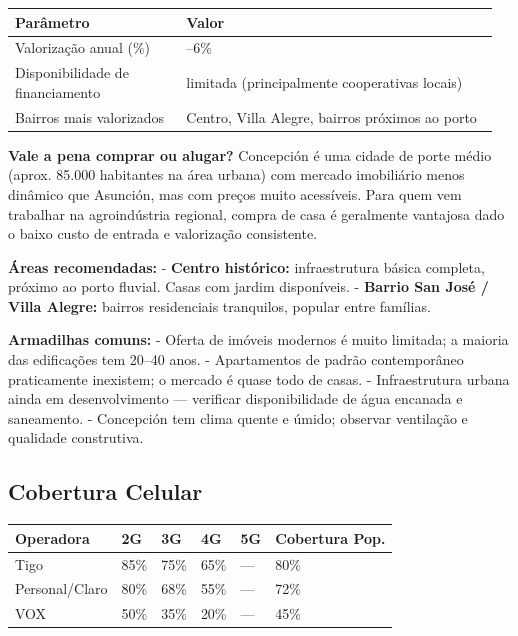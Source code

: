 {\small
\setlength{\tabcolsep}{3pt}
\renewcommand{\arraystretch}{1.12}
\begin{tabularx}{\linewidth}{>{\raggedright\arraybackslash}p{0.34\linewidth} >{\raggedright\arraybackslash}p{0.62\linewidth}}
\toprule
Parâmetro & Valor \\
\midrule
Valorização anual (\%) & 4--6\% \\
Disponibilidade de financiamento & limitada (principalmente cooperativas locais) \\
Bairros mais valorizados & Centro, Villa Alegre, bairros próximos ao porto \\
\bottomrule
\end{tabularx}
}


\textbf{Vale a pena comprar ou alugar?}
Concepción é uma cidade de porte médio (aprox. 85.000 habitantes na área urbana) com mercado imobiliário menos dinâmico que Asunción, mas com preços muito acessíveis. Para quem vem trabalhar na agroindústria regional, compra de casa é geralmente vantajosa dado o baixo custo de entrada e valorização consistente.

\textbf{Áreas recomendadas:}
- \textbf{Centro histórico:} infraestrutura básica completa, próximo ao porto fluvial. Casas com jardim disponíveis.
- \textbf{Barrio San José / Villa Alegre:} bairros residenciais tranquilos, popular entre famílias.

\textbf{Armadilhas comuns:}
- Oferta de imóveis modernos é muito limitada; a maioria das edificações tem 20--40 anos.
- Apartamentos de padrão contemporâneo praticamente inexistem; o mercado é quase todo de casas.
- Infraestrutura urbana ainda em desenvolvimento --- verificar disponibilidade de água encanada e saneamento.
- Concepción tem clima quente e úmido; observar ventilação e qualidade construtiva.




\subsection{Cobertura Celular}



{\small
\setlength{\tabcolsep}{3pt}
\renewcommand{\arraystretch}{1.12}
{\small
\begin{tabularx}{\linewidth}{lXXXXX}
\toprule
Operadora & 2G & 3G & 4G & 5G & Cobertura Pop. \\
\midrule
Tigo & 85\% & 75\% & 65\% & --- & 80\% \\
Personal/Claro & 80\% & 68\% & 55\% & --- & 72\% \\
VOX & 50\% & 35\% & 20\% & --- & 45\% \\
\bottomrule
\end{tabularx}
}
}

